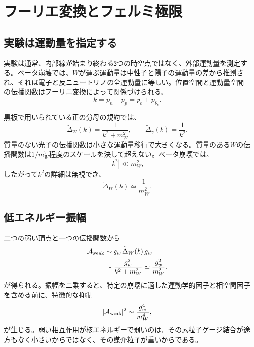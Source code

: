\section{フーリエ変換とフェルミ極限}

\subsection{実験は運動量を指定する}

実験は通常、内部線が始まり終わる2つの時空点ではなく、外部運動量を測定する。ベータ崩壊では、\(W\)が運ぶ運動量は中性子と陽子の運動量の差から推測され、それは電子と反ニュートリノの全運動量に等しい。位置空間と運動量空間の伝播関数はフーリエ変換によって関係づけられる。
\begin{equation}
  k=p_n-p_p=p_e+p_{\bar\nu_e}.
\end{equation}

黒板で用いられている正の分母の規約では、
\begin{equation}
  \widetilde{\Delta}_W(k)=\frac1{k^2+m_W^2},
  \qquad
  \widetilde{\Delta}_\gamma(k)=\frac1{k^2}.
\end{equation}
質量のない光子の伝播関数は小さな運動量移行で大きくなる。質量のある\(W\)の伝播関数は\(1/m_W^2\)程度のスケールを決して超えない。ベータ崩壊では、
\begin{equation}
  |k^2|\ll m_W^2,
\end{equation}
したがって\(k^2\)の詳細は無視でき、
\begin{equation}
  \widetilde{\Delta}_W(k)\simeq\frac1{m_W^2}.
\end{equation}

\begin{classroomqa}
\end{classroomqa}

\subsection{低エネルギー振幅}

二つの弱い頂点と一つの伝播関数から
\begin{align}
  \mathcal A_{\rm weak}
  &\sim g_w\,\widetilde{\Delta}_W(k)\,g_w\\
  &\sim\frac{g_w^2}{k^2+m_W^2}
  \simeq\frac{g_w^2}{m_W^2}.
\end{align}
が得られる。振幅を二乗すると、特定の崩壊に適した運動学的因子と相空間因子を含める前に、特徴的な抑制
\begin{equation}
  |\mathcal A_{\rm weak}|^2
  \sim\frac{g_w^4}{m_W^4},
\end{equation}
が生じる。弱い相互作用が核エネルギーで弱いのは、その素粒子ゲージ結合が途方もなく小さいからではなく、その媒介粒子が重いからである。

